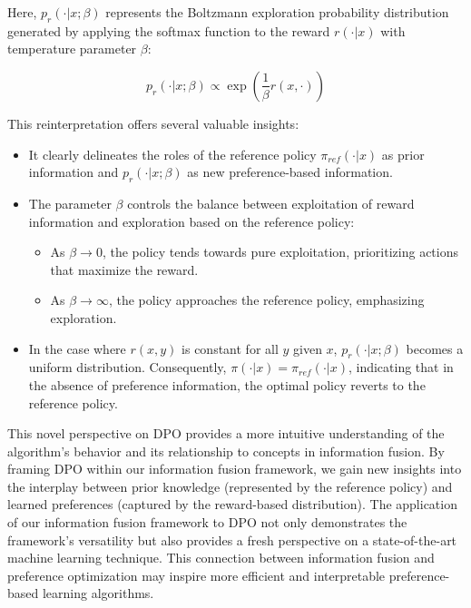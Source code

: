 \documentclass[letterpaper]{article} %
\theoremstyle{definition}
\theoremstyle{remark}
\begin{document}
Here, $p_r(\cdot|x;\beta)$ represents the Boltzmann exploration probability distribution generated by applying the softmax function to the reward $r(\cdot|x)$ with temperature parameter $\beta$:

\begin{equation}
    p_r(\cdot|x;\beta) \propto \exp(\frac{1}{\beta} r(x, \cdot))
\end{equation}

This reinterpretation offers several valuable insights:

\begin{itemize}
    \item It clearly delineates the roles of the reference policy $\pi_{ref}(\cdot|x)$ as prior information and $p_r(\cdot|x;\beta)$ as new preference-based information.
    
    \item The parameter $\beta$ controls the balance between exploitation of reward information and exploration based on the reference policy:
    \begin{itemize}
        \item As $\beta \to 0$, the policy tends towards pure exploitation, prioritizing actions that maximize the reward.
        \item As $\beta \to \infty$, the policy approaches the reference policy, emphasizing exploration.
    \end{itemize}
    
    \item In the case where $r(x, y)$ is constant for all $y$ given $x$, $p_r(\cdot|x;\beta)$ becomes a uniform distribution. Consequently, $\pi(\cdot|x) = \pi_{ref}(\cdot|x)$, indicating that in the absence of preference information, the optimal policy reverts to the reference policy.
\end{itemize}

This novel perspective on DPO provides a more intuitive understanding of the algorithm's behavior and its relationship to concepts in information fusion. By framing DPO within our information fusion framework, we gain new insights into the interplay between prior knowledge (represented by the reference policy) and learned preferences (captured by the reward-based distribution). The application of our information fusion framework to DPO not only demonstrates the framework's versatility but also provides a fresh perspective on a state-of-the-art machine learning technique. This connection between information fusion and preference optimization may inspire more efficient and interpretable preference-based learning algorithms.
\end{document}

